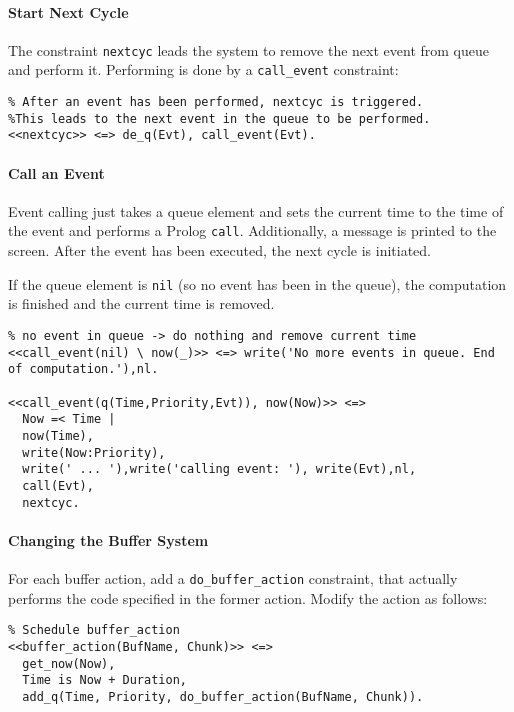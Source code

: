 \paragraph{Start Next Cycle} 

The constraint \lstinline|nextcyc| leads the system to remove the next event from queue and perform it. Performing is done by a \lstinline|call_event| constraint:

\begin{lstlisting}
% After an event has been performed, nextcyc is triggered. 
%This leads to the next event in the queue to be performed.
<<nextcyc>> <=> de_q(Evt), call_event(Evt).
\end{lstlisting}

\paragraph{Call an Event} 

Event calling just takes a queue element and sets the current time to the time of the event and performs a Prolog \lstinline|call|. Additionally, a message is printed to the screen. After the event has been executed, the next cycle is initiated.

If the queue element is \lstinline|nil| (so no event has been in the queue), the computation is finished and the current time is removed.

\begin{lstlisting}
% no event in queue -> do nothing and remove current time
<<call_event(nil) \ now(_)>> <=> write('No more events in queue. End of computation.'),nl.

<<call_event(q(Time,Priority,Evt)), now(Now)>> <=> 
  Now =< Time | 
  now(Time),
  write(Now:Priority),
  write(' ... '),write('calling event: '), write(Evt),nl,
  call(Evt),
  nextcyc.
\end{lstlisting}

\paragraph{Changing the Buffer System}
\label{changing_the_buffer_system}

For each buffer action, add a \lstinline|do_buffer_action| constraint, that actually performs the code specified in the former action. Modify the action as follows:

\begin{lstlisting}
% Schedule buffer_action
<<buffer_action(BufName, Chunk)>> <=> 
  get_now(Now),
  Time is Now + Duration, 
  add_q(Time, Priority, do_buffer_action(BufName, Chunk)). 
\end{lstlisting}

